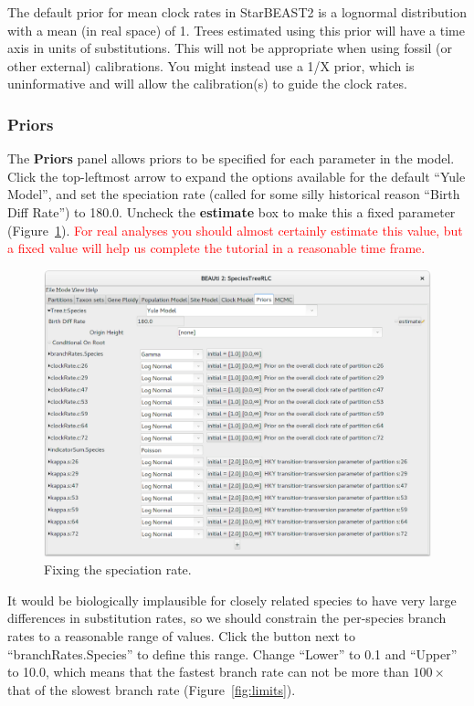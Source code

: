 \documentclass{article}
\begin{document}
The default prior for mean clock rates in StarBEAST2 is a lognormal distribution
with a mean (in real space) of 1. Trees estimated using this prior will have a
time axis in units of substitutions. This will not be appropriate when using
fossil (or other external) calibrations. You might instead use a 1/X prior,
which is uninformative and will allow the calibration(s) to guide the clock
rates.

\clearpage

\subsubsection*{Priors}

The \textbf{Priors} panel allows priors to be specified for each parameter in
the model. Click the top-leftmost arrow to expand the options available for the
default ``Yule Model'', and set the speciation rate (called for some silly
historical reason ``Birth Diff Rate'') to 180.0. Uncheck the
\textbf{estimate} box to make this a fixed parameter (Figure~\ref{fig:yule}). \textcolor{red}{For real
analyses you should almost certainly estimate this value, but a fixed value will
help us complete the tutorial in a reasonable time frame.}

\begin{figure}[htb!]
\centering
\includegraphics[width=\textwidth]{figures/beauti-yule.png}
\caption{Fixing the speciation rate.}
\label{fig:yule}
\end{figure}

It would be biologically implausible for closely related species to have very large
differences in substitution rates, so we should constrain the per-species branch
rates to a reasonable range of values. Click the button next to
``branchRates.Species'' to define this range. Change ``Lower'' to 0.1 and
``Upper'' to 10.0, which means that the fastest branch rate can not be more than
$100\times$ that of the slowest branch rate (Figure~\ref{fig:limits}).
\end{document}
